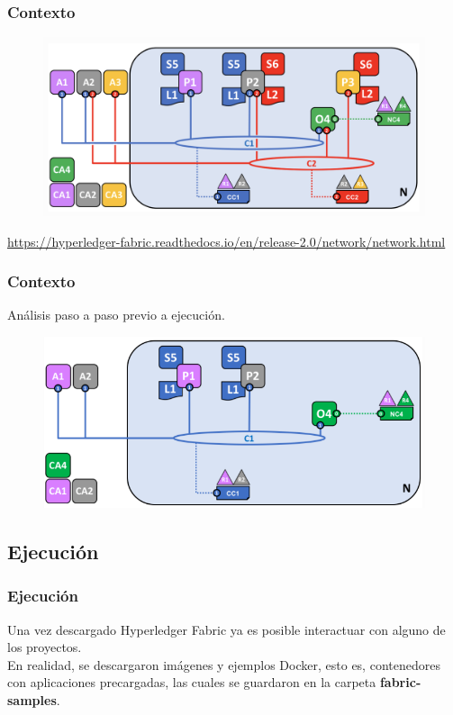 \documentclass{beamer}
\begin{document}
	\begin{frame}
		\frametitle{Contexto}
		\begin{figure}[h]
			\includegraphics[scale=.4]{start_01}
			\centering
		\end{figure}
		\begin{center}
			\tiny{\url{https://hyperledger-fabric.readthedocs.io/en/release-2.0/network/network.html}}
		\end{center}
	\end{frame}

	\begin{frame}
		\frametitle{Contexto}
		Análisis paso a paso previo a ejecución.
		\begin{figure}[h]
			\includegraphics[scale=.5]{start_03}
			\centering
		\end{figure}
	\end{frame}
	
	\subsection{Ejecución}
	
	\begin{frame}
		\frametitle{Ejecución}
		Una vez descargado Hyperledger Fabric ya es posible interactuar con alguno de los proyectos.\\
		\vspace{4mm}
		En realidad, se descargaron imágenes y ejemplos Docker, esto es, contenedores con aplicaciones precargadas, las cuales se guardaron en la carpeta \textbf{fabric-samples}.
	\end{frame}
\end{document}
